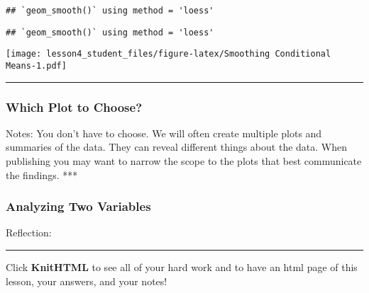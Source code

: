 \documentclass[]{article}
\begin{document}
\begin{verbatim}
## `geom_smooth()` using method = 'loess'
\end{verbatim}

\begin{verbatim}
## `geom_smooth()` using method = 'loess'
\end{verbatim}

\texttt{[image: lesson4\_student\_files/figure-latex/Smoothing Conditional Means-1.pdf]}

\begin{center}\rule{0.5\linewidth}{\linethickness}\end{center}

\subsubsection{Which Plot to Choose?}\label{which-plot-to-choose}

Notes: You don't have to choose. We will often create multiple plots and
summaries of the data. They can reveal different things about the data.
When publishing you may want to narrow the scope to the plots that best
communicate the findings. ***

\subsubsection{Analyzing Two Variables}\label{analyzing-two-variables}

Reflection:

\begin{center}\rule{0.5\linewidth}{\linethickness}\end{center}

Click \textbf{KnitHTML} to see all of your hard work and to have an html
page of this lesson, your answers, and your notes!
\end{document}
